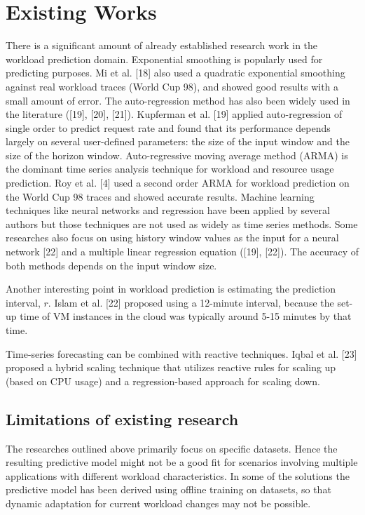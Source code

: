 \section{Existing Works}

There is a significant amount of already established research work in the workload prediction domain. Exponential smoothing is popularly used for predicting purposes. Mi et al. [18] also used a quadratic exponential smoothing against real workload traces (World Cup 98), and showed good results with a small amount of error. The auto-regression method has also been widely used in the literature ([19], [20], [21]). Kupferman et al. [19] applied auto-regression of single order to predict request rate and found that its performance depends largely on several user-defined parameters: the size of the input window and the size of the horizon window. Auto-regressive moving average method (ARMA) is the dominant time series analysis technique for workload and resource usage prediction. Roy et al. [4] used a second order ARMA for workload prediction on the World Cup 98 traces and showed accurate results. Machine learning techniques like neural networks and regression have been applied by several authors but those techniques are not used as widely as time series methods. Some researches also focus on using history window values as the input for a neural network [22] and a multiple linear regression equation ([19], [22]). The accuracy of both methods depends on the input window size.

Another interesting point in workload prediction is estimating the prediction interval, $r$. Islam et al. [22] proposed using a 12-minute interval, because the set-up time of VM instances in the cloud was typically around 5-15 minutes by that time.

Time-series forecasting can be combined with reactive techniques. Iqbal et al. [23] proposed a hybrid scaling technique that utilizes reactive rules for scaling up (based on CPU usage) and a regression-based approach for scaling down.

\subsection{Limitations of existing research}

The researches outlined above primarily focus on specific datasets. Hence the resulting predictive model might not be a good fit for scenarios involving multiple applications with different workload characteristics. In some of the solutions the predictive model has been derived using offline training on datasets, so that dynamic adaptation for current workload changes may not be possible.

